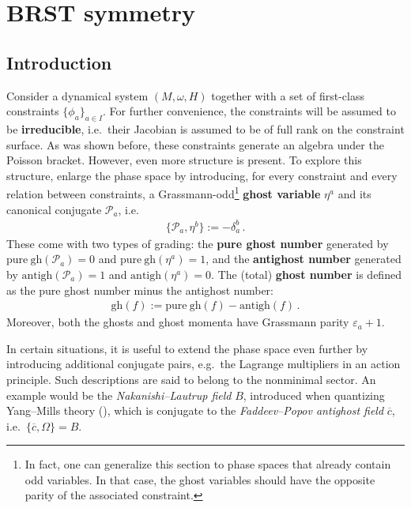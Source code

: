 \section{BRST symmetry}\label{section:classical_brst}
\subsection{Introduction}\label{section:brst_introduction}

    Consider a dynamical system $(M,\omega,H)$ together with a set of first-class constraints $\{\phi_a\}_{a\in I}$. For further convenience, the constraints will be assumed to be \textbf{irreducible}, i.e.~their Jacobian is assumed to be of full rank on the constraint surface. As was shown before, these constraints generate an algebra under the Poisson bracket. However, even more structure is present. To explore this structure, enlarge the phase space by introducing, for every constraint and every relation between constraints, a Grassmann-odd\footnote{In fact, one can generalize this section to phase spaces that already contain odd variables. In that case, the ghost variables should have the opposite parity of the associated constraint.} \textbf{ghost variable} $\eta^a$ and its canonical conjugate $\mathcal{P}_a$, i.e.
    \begin{gather}
        \{\mathcal{P}_a,\eta^b\} := -\delta^b_a\,.
    \end{gather}
    These come with two types of grading: the \textbf{pure ghost number} generated by $\mathrm{pure\ gh}(\mathcal{P}_a) = 0$ and $\mathrm{pure\ gh}(\eta^a) = 1$, and the \textbf{antighost number} generated by $\mathrm{antigh}(\mathcal{P}_a) = 1$ and $\mathrm{antigh}(\eta^a) = 0$. The (total) \textbf{ghost number} is defined as the pure ghost number minus the antighost number:
    \begin{gather}
        \mathrm{gh}(f) := \mathrm{pure\ gh}(f) - \mathrm{antigh}(f)\,.
    \end{gather}
    Moreover, both the ghosts and ghost momenta have Grassmann parity $\varepsilon_a+1$.

    \begin{remark}
        In certain situations, it is useful to extend the phase space even further by introducing additional conjugate pairs, e.g.~the Lagrange multipliers in an action principle. Such descriptions are said to belong to the nonminimal sector. An example would be the \textit{Nakanishi--Lautrup field} $B$, introduced when quantizing Yang--Mills theory (), which is conjugate to the \textit{Faddeev--Popov antighost field} $\overline{c}$, i.e.~$\{\overline{c},\Omega\}=B$.
    \end{remark}

